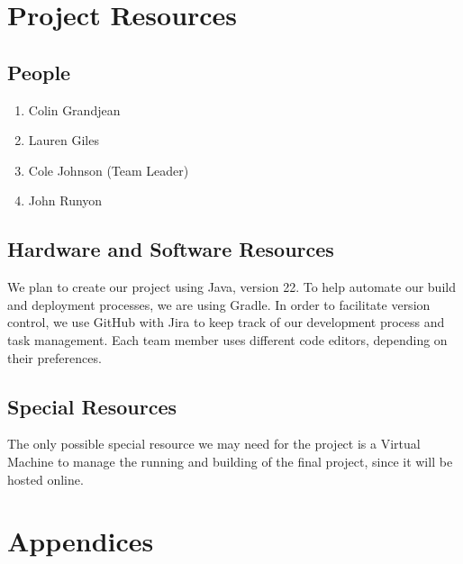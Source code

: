\documentclass[english,12pt]{article}
\begin{document}
\section{Project Resources}

\subsection{People}
\begin{enumerate}
  \item Colin Grandjean 
  \item Lauren Giles   
  \item Cole Johnson (Team Leader)
  \item John Runyon    
\end{enumerate}
\subsection{Hardware and Software Resources}
We plan to create our project using Java, version 22. 
To help automate our build and deployment processes, we are using Gradle. 
In order to facilitate version control, we use GitHub with Jira to keep track of our 
development process and task management. Each team member uses different 
code editors, depending on their preferences.

\subsection{Special Resources}
The only possible special resource we may need for the project is a Virtual Machine 
to manage the running and building of the final project, since it will be hosted online.

\section{Appendices}
\end{document}
